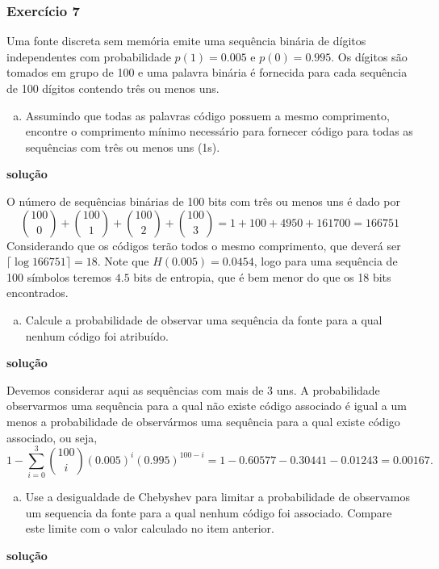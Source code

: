 \begin{frame}[allowframebreaks]
  \frametitle{Exercício 7}
  \begin{exercise}
  Uma fonte discreta sem memória emite uma sequência binária de dígitos independentes com 
  probabilidade $p(1)=0.005$ e $p(0) = 0.995$. Os dígitos são tomados em grupo de 100 e 
  uma palavra binária é fornecida para cada sequência de 100 dígitos contendo três ou menos uns.

  \exercisebreak
  \begin{enumerate}[a)]
  \item Assumindo que todas as palavras código possuem a mesmo comprimento, encontre o comprimento mínimo
	necessário para fornecer código para todas as sequências com três ou menos uns (1s).
  \end{enumerate}

  \textbf{solução}
 
  O número de sequências binárias de 100 bits com três ou menos uns é dado por
  \begin{equation}
  {100 \choose 0} + {100 \choose 1} + {100 \choose 2} + {100 \choose 3} = 1 + 100 + 4950 + 161700 = 166751
  \end{equation}
  \exercisebreak
  Considerando que os códigos terão todos o mesmo comprimento, que deverá ser 
  $\lceil \log 166751 \rceil = 18$. Note que $H(0.005) = 0.0454$, logo para uma sequência de 100 símbolos
  teremos $4.5$ bits de entropia, que é bem menor do que os 18 bits encontrados.


  \exercisebreak
  \begin{enumerate}[b)]
  \item Calcule a probabilidade de observar uma sequência da fonte para a qual nenhum código foi atribuído.
  \end{enumerate}
  \textbf{solução}
  
  Devemos considerar aqui as sequências com mais de 3 uns. A probabilidade observarmos uma sequência para a
  qual não existe código associado é igual a um menos a probabilidade de observármos uma sequência para a 
  qual existe código associado, ou seja,
  \begin{equation}
  1 - \sum_{i=0}^{3} {100 \choose i} (0.005)^i (0.995)^{100-i} = 1 - 0.60577 - 0.30441 - 0.01243 = 0.00167.
  \end{equation}


  \exercisebreak
  \begin{enumerate}[c)]
  \item Use a desigualdade de Chebyshev para limitar a probabilidade de observamos um sequencia da fonte
	para a qual nenhum código foi associado. Compare este limite com o valor calculado no item anterior.
  \end{enumerate}
  \textbf{solução}


\end{exercise}
\end{frame}
